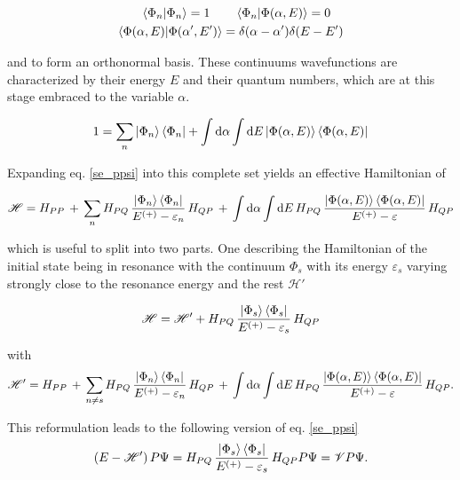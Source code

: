 \begin{align}
  \braket{\Phi_n|\Phi_n} = 1 \quad  & \quad \braket{\Phi_n|\Phi(\alpha,E)} = 0\\
  \braket{\Phi(\alpha,E)|\Phi(\alpha',E')} & = \delta(\alpha-\alpha') \delta(E-E')
\end{align}

and to form an orthonormal basis. These continuums wavefunctions are characterized
by their energy $E$ and their quantum numbers, which are at this stage embraced
to the variable $\alpha$.

\begin{equation}
  1 = \sum\limits_n \ket{\Phi_n}\bra{\Phi_n} + \int \mathrm{d}\alpha \int \mathrm{d}E
      \ket{\Phi(\alpha,E)}\bra{\Phi(\alpha,E)} \label{feshbach_1}
\end{equation}

Expanding eq. \ref{se_ppsi} into this complete set yields an effective Hamiltonian
of

\begin{equation}
  \mathscr{H} = H_{PP}\, + \,
  \sum\limits_n H_{PQ} \,\frac{\ket{\Phi_n}\bra{\Phi_n}}{E^{(+)}-\varepsilon_n}\, H_{QP} \,+\,
  \int \mathrm{d}\alpha \int\mathrm{d}E \,H_{PQ} \,
  \frac{\ket{\Phi(\alpha,E)}\bra{\Phi(\alpha,E)}}{E^{(+)}-\varepsilon} \, H_{QP}
\end{equation}

which is useful to split into two parts. One describing the Hamiltonian of the
initial state being in resonance with the continuum $\Phi_s$ with its energy
$\varepsilon_s$ varying strongly close to the resonance energy and the rest
$\mathscr{H}'$

\begin{equation}
  \mathscr{H} = \mathscr{H}' + H_{PQ} \,\frac{\ket{\Phi_s}\bra{\Phi_s}}{E^{(+)}-\varepsilon_s}\, H_{QP}
\end{equation}

with
\begin{equation}
  \mathscr{H}' = H_{PP}\, + \,
  \sum\limits_{n\ne s} H_{PQ} \,\frac{\ket{\Phi_n}\bra{\Phi_n}}{E^{(+)}-\varepsilon_n}
  \, H_{QP} \,+\,
  \int \mathrm{d}\alpha \int\mathrm{d}E \,H_{PQ} \,
  \frac{\ket{\Phi(\alpha,E)}\bra{\Phi(\alpha,E)}}{E^{(+)}-\varepsilon} \, H_{QP} .
\end{equation}

This reformulation leads to the following version of eq. \ref{se_ppsi}
\begin{equation}
  (E - \mathscr{H}')\, P \Psi =
   H_{PQ} \,\frac{\ket{\Phi_s}\bra{\Phi_s}}{E^{(+)}-\varepsilon_s}\, H_{QP} P \Psi = \mathscr{V} P \Psi.
\end{equation}

